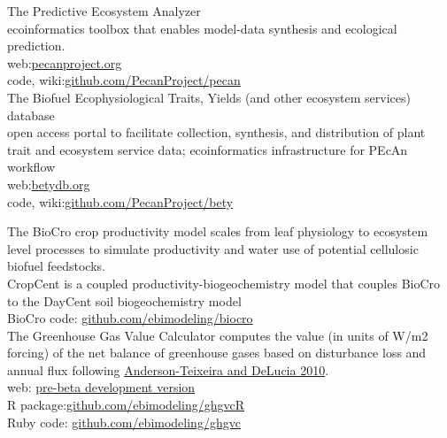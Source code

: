 \documentclass{xetexCV}
\begin{document}
\newpage
{}

\hspace{1em}

  The Predictive Ecosystem Analyzer\\ ecoinformatics toolbox that enables model-data synthesis and ecological prediction. \\
web:\href{http://www.pecanproject.org}{pecanproject.org} \\ 
code, wiki:\href{https://github.com/PecanProject/pecan}{github.com/PecanProject/pecan}\\


 The Biofuel Ecophysiological Traits, Yields (and other ecosystem services) database\\ open access portal to facilitate collection, synthesis, and distribution of plant trait and ecosystem service data; ecoinformatics infrastructure for PEcAn workflow \\ 
web:\href{http://www.betydb.org}{betydb.org} \\ 
code, wiki:\href{https://github.com/PecanProject/bety}{github.com/PecanProject/bety}\\


\hspace{1em}

 The BioCro crop productivity model scales from leaf physiology to ecosystem level processes to simulate productivity and water use of potential cellulosic biofuel feedstocks.\\
 CropCent is a coupled productivity-biogeochemistry model that couples BioCro to the DayCent soil biogeochemistry model\\
BioCro code: \href{https://github.com/ebimodeling/biocro}{github.com/ebimodeling/biocro}\\


 The Greenhouse Gas Value Calculator computes the value (in units of W/m2 forcing) of the net balance of greenhouse gases based on disturbance loss and annual flux following \href{http://dx.doi.org/10.1111/j.1365-2486.2010.02220.x}{ Anderson-Teixeira and DeLucia 2010}.\\
web: \href{http://pecandev.igb.illinois.edu:6480/}{pre-beta development version}\\
R package:\href{https://github.com/ebimodeling/ghgvcR}{github.com/ebimodeling/ghgvcR}\\
Ruby code: \href{https://github.com/ebimodeling/ghgvc}{github.com/ebimodeling/ghgvc}\\
\end{document}
